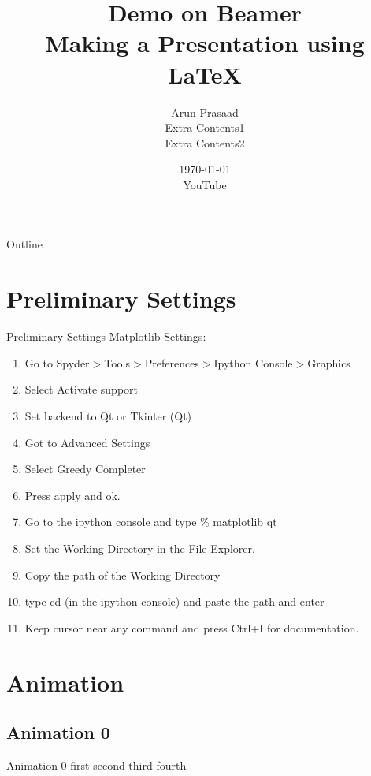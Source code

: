 \documentclass[handout]{beamer} %
\title[Beamer \hspace{5mm} \insertframenumber / \inserttotalframenumber]{Demo on Beamer \\ Making a Presentation using \LaTeX}
\author[Arun, YouTube]{Arun Prasaad \\ Extra Contents1 \\ Extra Contents2}
\date{\today  \\ YouTube}
\begin{document}

\begin{frame}
	\titlepage
\end{frame}

\begin{frame}{Outline} %
	\tableofcontents
\end{frame}


\section{Preliminary Settings}

\begin{frame}{Preliminary Settings}
	Matplotlib Settings:
	\begin{enumerate}
		\item Go to Spyder$>$Tools$>$Preferences$>$Ipython Console$>$Graphics
		\item Select Activate support
		\item {\color{red} Set backend to Qt or Tkinter (Qt)}
		\item Got to Advanced Settings
		\item Select Greedy Completer
		\item Press apply and ok.
		\item Go to the ipython console and type \% matplotlib qt
		\item Set the Working Directory in the File Explorer.
		\item Copy the path of the Working Directory
		\item type cd (in the ipython console) and paste the path and enter
		\item Keep cursor near any command and press Ctrl+I for documentation.
	\end{enumerate}
\end{frame}

\section{Animation}

\subsection{Animation 0}
\begin{frame}{Animation 0}
	first \pause second \pause third \pause fourth
\end{frame}
\end{document}
